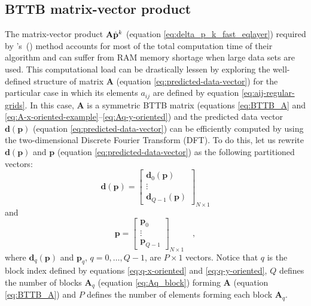 \documentclass[manuscript,revised]{geophysics}
\begin{document}
\subsection{BTTB matrix-vector product}

The matrix-vector product $\tensor{A} \hat{\mathbf{p}}^{k}$ (equation \ref{eq:delta_p_k_fast_eqlayer}) 
required by \citeauthor{siqueira-etal2017}'s~(\citeyear{siqueira-etal2017}) method
accounts for most of the total computation time of their algorithm and can suffer
from RAM memory shortage when large data sets are used.
This computational load can be drastically lessen by exploring the well-defined structure of 
matrix $\mathbf{A}$ (equation \ref{eq:predicted-data-vector}) for the particular case in which 
its elements $a_{ij}$ are defined by equation \ref{eq:aij-regular-grids}. 
In this case, $\mathbf{A}$ is a symmetric BTTB matrix (equations \ref{eq:BTTB_A} and 
\ref{eq:A-x-oriented-example}--\ref{eq:Aq-y-oriented}) and the predicted data vector 
$\mathbf{d}(\mathbf{p})$ (equation \ref{eq:predicted-data-vector}) can be efficiently
computed by using the two-dimensional Discrete Fourier Transform (DFT).
To do this, let us rewrite $\mathbf{d}(\mathbf{p})$ and
$\mathbf{p}$ (equation \ref{eq:predicted-data-vector}) as the following partitioned vectors:
\begin{equation}
\mathbf{d}(\mathbf{p}) = \begin{bmatrix}
\mathbf{d}_{0}(\mathbf{p}) \\
\vdots \\
\mathbf{d}_{Q - 1}(\mathbf{p})
\end{bmatrix}_{N \times 1}
\label{eq:predicted-data-vector-partitioned}
\end{equation}
and
\begin{equation}
\mathbf{p} = \begin{bmatrix}
\mathbf{p}_{0} \\
\vdots \\
\mathbf{p}_{Q - 1}
\end{bmatrix}_{N \times 1} \quad ,
\label{eq:parameter-vector-partitioned}
\end{equation}
where $\mathbf{d}_{q}(\mathbf{p})$ and $\mathbf{p}_{q}$, $q = 0, \dots, Q - 1$,
are $P \times 1$ vectors. Notice that $q$ is the block index defined by equations 
\ref{eq:q-x-oriented} and \ref{eq:q-y-oriented}, $Q$ defines the number of blocks
$\mathbf{A}_{q}$ (equation \ref{eq:Aq_block}) forming $\mathbf{A}$ (equation \ref{eq:BTTB_A}) 
and $P$ defines the number of elements forming each block $\mathbf{A}_{q}$.
\end{document}
